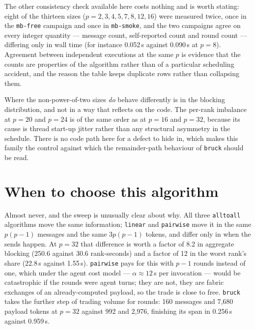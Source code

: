 \documentclass[11pt]{article}
\begin{document}
The other consistency check available here costs nothing and is worth stating: eight of the
thirteen sizes ($p=2,3,4,5,7,8,12,16$) were measured twice, once in the \texttt{mb-free}
campaign and once in \texttt{mb-smoke}, and the two campaigns agree on every integer
quantity --- message count, self-reported count and round count --- differing only in wall
time (for instance 0.052\,s against 0.090\,s at $p=8$). Agreement between independent
executions at the same $p$ is evidence that the counts are properties of the algorithm rather
than of a particular scheduling accident, and the reason the table keeps duplicate rows rather
than collapsing them.

Where the non-power-of-two sizes \emph{do} behave differently is in the blocking distribution,
and not in a way that reflects on the code. The per-rank imbalance at $p=20$ and $p=24$ is of
the same order as at $p=16$ and $p=32$, because its cause is thread start-up jitter rather
than any structural asymmetry in the schedule. There is no code path here for a defect to hide
in, which makes this family the control against which the remainder-path behaviour of
\texttt{bruck} should be read.

\section{When to choose this algorithm}

Almost never, and the sweep is unusually clear about why. All three \texttt{alltoall}
algorithms move the same information; \texttt{linear} and \texttt{pairwise} move it in the
same $p(p-1)$ messages and the same $3p(p-1)$ tokens, and differ only in when the sends
happen. At $p=32$ that difference is worth a factor of 8.2 in aggregate blocking (250.6
against 30.6 rank-seconds) and a factor of 12 in the worst rank's share (22.8\,s against
1.55\,s). \texttt{pairwise} pays for this with $p-1$ rounds instead of one, which under the
agent cost model --- $\alpha \approx 12$\,s per invocation --- would be catastrophic if the
rounds were agent turns; they are not, they are fabric exchanges of an already-computed
payload, so the trade is close to free. \texttt{bruck} takes the further step of trading
volume for rounds: 160 messages and 7,680 payload tokens at $p=32$ against 992 and 2,976,
finishing its span in 0.256\,s against 0.959\,s.
\end{document}
